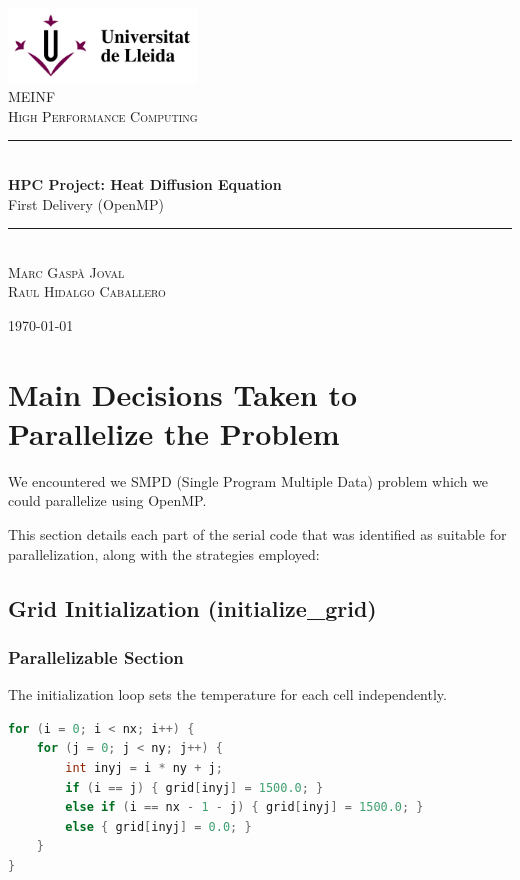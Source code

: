 \documentclass[12pt]{article}
\begin{document}
\begin{titlepage}
	\newcommand{\HRule}{\rule{\linewidth}{0.5mm}}

	\center

	\includegraphics[width=5cm]{logoudl.png}\\
	\textsc{\Large MEINF}\\[0.5cm]
	\textsc{\large High Performance Computing}\\[0.5cm]

	\HRule\\[0.4cm]

	{\huge\bfseries HPC Project: Heat Diffusion Equation}\\[0.4cm]
	{\LARGE First Delivery (OpenMP)}
	\HRule\\[1.5cm]

	\textsc{Marc Gaspà Joval\\Raul Hidalgo Caballero}

	\vfill\vfill\vfill
	{\large\today}
\end{titlepage}
\pagebreak
\thispagestyle{empty}
\tableofcontents
\pagebreak

\section{Main Decisions Taken to Parallelize the Problem}

We encountered we SMPD (Single Program Multiple Data) problem which we could parallelize using OpenMP. 

This section details each part of the serial code that was identified as suitable for parallelization, along with the strategies employed:

\subsection{Grid Initialization (initialize\_grid)}

\subsubsection{Parallelizable Section}
The initialization loop sets the temperature for each cell independently.
\begin{lstlisting}[language=C]
for (i = 0; i < nx; i++) {
	for (j = 0; j < ny; j++) {
		int inyj = i * ny + j;
		if (i == j) { grid[inyj] = 1500.0; }
		else if (i == nx - 1 - j) { grid[inyj] = 1500.0; }
		else { grid[inyj] = 0.0; }
	}
}
\end{lstlisting}
\end{document}
